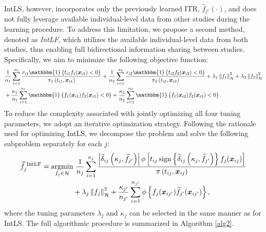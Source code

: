 \documentclass[12pt]{article}
\DeclareMathOperator*{\argmin}{argmin}
\DeclareMathOperator{\sign}{sign}
\begin{document}
IntLS, however, incorporates only the previously learned ITR, $\widehat{f}_{j'}(\cdot)$, and does not fully leverage available individual-level data from other studies during the learning procedure. To address this limitation, we propose a second method, denoted as {\it IntLF}, which utilizes the available individual-level data from both studies, thus enabling full bidirectional information sharing between studies. Specifically, we aim to minimize the following objective function:
\begin{align*}
    &\frac{1}{n_1}\sum^{n_1}_{i=1}\frac{r_{i1}\mathbbm{1}\left\{t_{i1}f_1(\boldsymbol x_{i1})<0\right\}}{\pi_1\left(t_{i1},\boldsymbol x_{i1}\right)} +\frac{1}{n_2}\sum^{n_2}_{i=1}\frac{r_{i2}\mathbbm{1}\left\{t_{i2}f_2(\boldsymbol x_{i2})<0\right\}}{\pi_2\left(t_{i2},\boldsymbol x_{i2}\right)}+\lambda_{1}\left\|f_1\right\|^2_\mathcal{H}+\lambda_{2}\left\|f_2\right\|^2_\mathcal{H}\\
    &+\frac{\kappa_1}{n_1}\sum^{n_1}_{i=1}\mathbbm{1}\left\{f_1(\boldsymbol x_{i1})f_2(\boldsymbol x_{i1})<0\right\}+\frac{\kappa_2}{n_2}\sum^{n_2}_{i=1}\mathbbm{1}\left\{f_1(\boldsymbol x_{i2})f_2(\boldsymbol x_{i2})<0\right\}.
\end{align*}
To reduce the complexity associated with jointly optimizing all four tuning parameters, we adopt an iterative optimization strategy. Following the rationale used for optimizing IntLS, we decompose the problem and solve the following subproblem separately for each $j$:
\begin{align*}
    \widehat{f}^\text{\ IntLF}_j=\argmin_{f_j\in\mathcal{H}}&\ \frac{1}{n_j}\sum^{n_j}_{i=1}\frac{\left|\widetilde{\delta}_{ij}\left(\kappa_j, \widehat{f}_{j'}\right)\right|\phi\left[t_{ij}\sign\left\{\widetilde{\delta}_{ij}\left(\kappa_j, \widehat{f}_{j'}\right)\right\}f_j(\boldsymbol x_{ij})\right]}{\pi\left(t_{ij},\boldsymbol x_{ij}\right)}\notag\\ &+\lambda_j\left\|f_j\right\|^2_\mathcal{H} +\frac{\kappa_{j'}}{n_{j'}}\sum^{n_{j'}}_{i=1}\phi\left\{f_j(\boldsymbol x_{ij'})\widehat{f}_{j'}(\boldsymbol x_{ij'})\right\},
\end{align*}
where the tuning parameters $\lambda_j$ and $\kappa_j$ can be selected in the same manner as for IntLS. The full algorithmic procedure is summarized in Algorithm \ref{alg2}.
\end{document}
